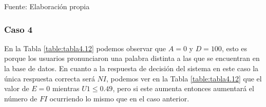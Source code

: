 \begin{center}
\begin{table}[H]
\centering
\caption{\small{Resultados para obtener U1 en el caso 3.}}
\label{table:tabla4.11}
\vskip 0.2cm
\begin{center}
\vskip 0.2cm
{\small{Fuente: Elaboración propia}}
\end{center}
\end{table}
\end{center}

\subsubsection{Caso 4}
En la Tabla \ref{table:tabla4.12} podemos observar que $A = 0$ y $D = 100$, esto es porque los usuarios pronunciaron una palabra distinta a las que se encuentran en la base de datos.
\vskip 0.5cm
En cuanto a la respuesta de decisión del sistema en este caso la única respuesta correcta será $NI$, podemos ver en la Tabla \ref{table:tabla4.12} que el valor de $E = 0$ mientras $U1 \leq 0.49$, pero si este aumenta entonces aumentará el número de $FI$ ocurriendo lo mismo que en el caso anterior.

